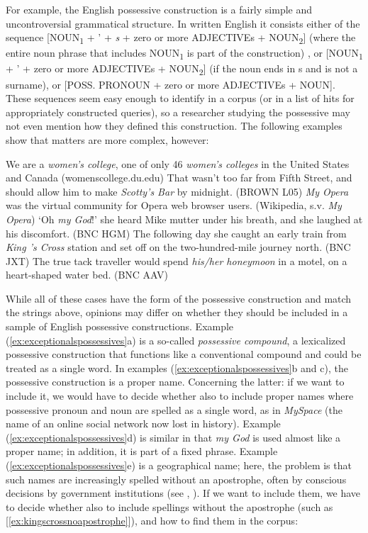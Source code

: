 For example, the English possessive construction is a fairly simple and uncontroversial grammatical structure. In written English it consists either of the sequence [NOUN\textsubscript{1} + ' + \textit{s} + zero or more ADJECTIVEs + NOUN\textsubscript{2}] (where the entire noun phrase that includes NOUN\textsubscript{1} is part of the construction) , or [NOUN\textsubscript{1} + ' + zero or more ADJECTIVEs + NOUN\textsubscript{2}] (if the noun ends in s and is not a surname), or [POSS. PRONOUN + zero or more ADJECTIVEs + NOUN]. These sequences seem easy enough to identify in a corpus (or in a list of hits for appropriately constructed queries), so a researcher studying the possessive may not even mention how they defined this construction. The following examples show that matters are more complex, however:

\begin{exe}
\ex
\begin{xlist} 
\label{ex:exceptionalspossessives}
\ex We are a \textit{women's college}, one of only 46 \textit{women's colleges} in the United States and Canada (womenscollege.du.edu)
\ex That wasn't too far from Fifth Street, and should allow him to make \textit{Scotty's Bar} by midnight. (BROWN L05)
\ex \textit{My Opera} was the virtual community for Opera web browser users. (Wikipedia, s.v. \textit{My Opera})
\ex `Oh \textit{my God}!' she heard Mike mutter under his breath, and she laughed at his discomfort. (BNC HGM)
\ex The following day she caught an early train from \textit{King 's Cross} station and set off on the two-hundred-mile journey north. (BNC JXT)
\ex The true tack traveller would spend \textit{his/her honeymoon} in a motel, on a heart-shaped water bed. (BNC AAV)
\end{xlist}
\end{exe}

While all of these cases have the form of the possessive construction and match the strings above, opinions may differ on whether they should be included in a sample of English possessive constructions. Example (\ref{ex:exceptionalspossessives}a) is a so-called \textit{possessive compound}, a lexicalized possessive construction that functions like a conventional compound and could be treated as a single word. In examples (\ref{ex:exceptionalspossessives}b and c), the possessive construction is a proper name. Concerning the latter: if we want to include it, we would have to decide whether also to include proper names where possessive pronoun and noun are spelled as a single word, as in \emph{MySpace} (the name of an online social network now lost in history). Example (\ref{ex:exceptionalspossessives}d) is similar in that \textit{my God} is used almost like a proper name; in addition, it is part of a fixed phrase. Example (\ref{ex:exceptionalspossessives}e) is a geographical name; here, the problem is that such names are increasingly spelled without an apostrophe, often by conscious decisions by government institutions (see \citep{swaine_apostrophes_2009}, \citep{newman_u.s._2013}). If we want to include them, we have to decide whether also to include spellings without the apostrophe (such as [\ref{ex:kingscrossnoapostrophe}]), and how to find them in the corpus:

